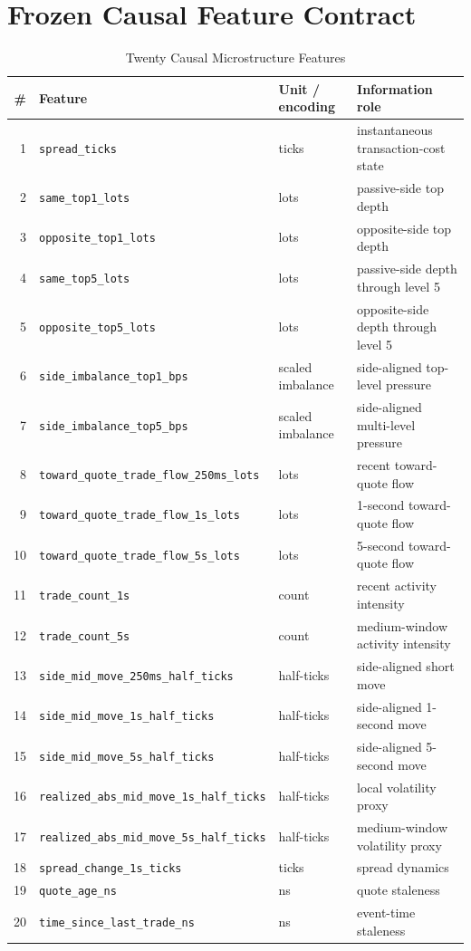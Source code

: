 \documentclass[journal,10pt]{IEEEtran}
\newcommand{\1}{\mathbf{1}}
\begin{document}
\section{Frozen Causal Feature Contract}
\label{app:features}
\begin{table}[t]
\centering
\caption{Twenty Causal Microstructure Features}
\label{tab:features}
\begin{tabular}{rlll}
\toprule
\# & Feature & Unit / encoding & Information role \\
\midrule
1 & \texttt{spread\_ticks} & ticks & instantaneous transaction-cost state \\
2 & \texttt{same\_top1\_lots} & lots & passive-side top depth \\
3 & \texttt{opposite\_top1\_lots} & lots & opposite-side top depth \\
4 & \texttt{same\_top5\_lots} & lots & passive-side depth through level 5 \\
5 & \texttt{opposite\_top5\_lots} & lots & opposite-side depth through level 5 \\
6 & \texttt{side\_imbalance\_top1\_bps} & scaled imbalance & side-aligned top-level pressure \\
7 & \texttt{side\_imbalance\_top5\_bps} & scaled imbalance & side-aligned multi-level pressure \\
8 & \texttt{toward\_quote\_trade\_flow\_250ms\_lots} & lots & recent toward-quote flow \\
9 & \texttt{toward\_quote\_trade\_flow\_1s\_lots} & lots & 1-second toward-quote flow \\
10 & \texttt{toward\_quote\_trade\_flow\_5s\_lots} & lots & 5-second toward-quote flow \\
11 & \texttt{trade\_count\_1s} & count & recent activity intensity \\
12 & \texttt{trade\_count\_5s} & count & medium-window activity intensity \\
13 & \texttt{side\_mid\_move\_250ms\_half\_ticks} & half-ticks & side-aligned short move \\
14 & \texttt{side\_mid\_move\_1s\_half\_ticks} & half-ticks & side-aligned 1-second move \\
15 & \texttt{side\_mid\_move\_5s\_half\_ticks} & half-ticks & side-aligned 5-second move \\
16 & \texttt{realized\_abs\_mid\_move\_1s\_half\_ticks} & half-ticks & local volatility proxy \\
17 & \texttt{realized\_abs\_mid\_move\_5s\_half\_ticks} & half-ticks & medium-window volatility proxy \\
18 & \texttt{spread\_change\_1s\_ticks} & ticks & spread dynamics \\
19 & \texttt{quote\_age\_ns} & ns & quote staleness \\
20 & \texttt{time\_since\_last\_trade\_ns} & ns & event-time staleness \\
\bottomrule
\end{tabular}
\end{table}
\end{document}
